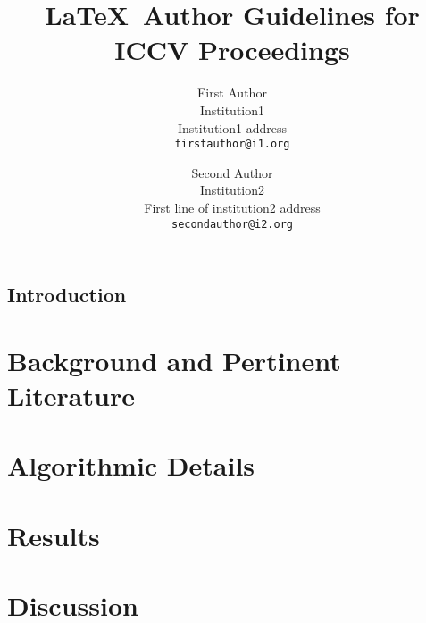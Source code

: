 \documentclass[10pt,twocolumn,letterpaper]{article}
\begin{document}
\title{\LaTeX\ Author Guidelines for ICCV Proceedings}

\author{First Author\\
Institution1\\
Institution1 address\\
{\tt\small firstauthor@i1.org}
\and
Second Author\\
Institution2\\
First line of institution2 address\\
{\tt\small secondauthor@i2.org}
}

\maketitle
\thispagestyle{empty}


\begin{abstract}

\end{abstract}

\subsection{Introduction}


\section{Background and Pertinent Literature}


\section{Algorithmic Details}


\section{Results}


\section{Discussion}


{\small


}
\end{document}
